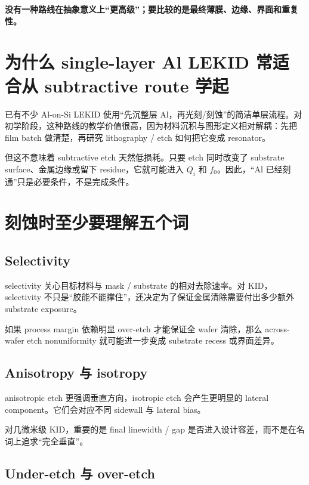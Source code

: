 \begin{center}
\textbf{没有一种路线在抽象意义上“更高级”；要比较的是最终薄膜、边缘、界面和重复性。}
\end{center}

\section{为什么 single-layer Al LEKID 常适合从 subtractive route 学起}

已有不少 Al-on-Si LEKID 使用“先沉整层 Al，再光刻/刻蚀”的简洁单层流程。对初学阶段，这种路线的教学价值很高，因为材料沉积与图形定义相对解耦：先把 film batch 做清楚，再研究 lithography / etch 如何把它变成 resonator。

但这不意味着 subtractive etch 天然低损耗。只要 etch 同时改变了 substrate surface、金属边缘或留下 residue，它就可能进入 $Q_i$ 和 $f_0$。因此，“Al 已经刻通”只是必要条件，不是完成条件。

\section{刻蚀时至少要理解五个词}

\subsection{Selectivity}

selectivity 关心目标材料与 mask / substrate 的相对去除速率。对 KID，selectivity 不只是“胶能不能撑住”，还决定为了保证金属清除需要付出多少额外 substrate exposure。

如果 process margin 依赖明显 over-etch 才能保证全 wafer 清除，那么 across-wafer etch nonuniformity 就可能进一步变成 substrate recess 或界面差异。

\subsection{Anisotropy 与 isotropy}

anisotropic etch 更强调垂直方向，isotropic etch 会产生更明显的 lateral component。它们会对应不同 sidewall 与 lateral bias。

对几微米级 KID，重要的是 final linewidth / gap 是否进入设计容差，而不是在名词上追求“完全垂直”。

\subsection{Under-etch 与 over-etch}

